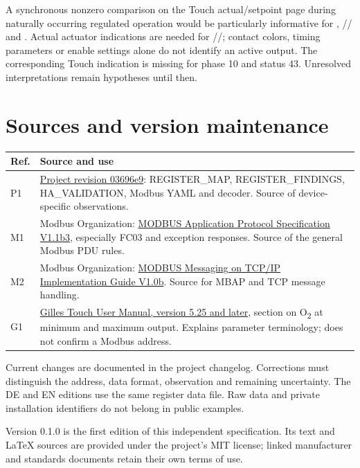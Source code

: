 \documentclass[10pt,a4paper]{article}
\begin{document}
A synchronous nonzero comparison on the Touch actual/setpoint page during naturally occurring regulated operation would be particularly informative for , // and . Actual actuator indications are needed for //; contact colors, timing parameters or enable settings alone do not identify an active output. The corresponding Touch indication is missing for phase 10 and status 43. Unresolved interpretations remain hypotheses until then.

\section{Sources and version maintenance}
\label{sec:sources}
\par\noindent\begin{tabularx}{\linewidth}{@{}L{13mm}X@{}}
\toprule\textbf{Ref.}&\textbf{Source and use}\\\midrule
P1 & \href{https://github.com/mschabhuettl/gilles-hpk-ra-modbus/tree/03696e929aa14fee1007d7c630489978c27533fc}{Project revision 03696e9}: REGISTER\_MAP, REGISTER\_FINDINGS, HA\_VALIDATION, Modbus YAML and decoder. Source of device-specific observations.\\
M1 & Modbus Organization: \href{https://www.modbus.org/file/secure/modbusprotocolspecification.pdf}{MODBUS Application Protocol Specification V1.1b3}, especially FC03 and exception responses. Source of the general Modbus PDU rules.\\
M2 & Modbus Organization: \href{https://www.modbus.org/file/secure/messagingimplementationguide.pdf}{MODBUS Messaging on TCP/IP Implementation Guide V1.0b}. Source for MBAP and TCP message handling.\\
G1 & \href{https://shop.baxi.se/documents/Gilles\%20Touch\%20-\%20manual\%20v5.25\%20(ENG).pdf}{Gilles Touch User Manual, version 5.25 and later}, section on O\textsubscript{2} at minimum and maximum output. Explains parameter terminology; does not confirm a Modbus address.\\\bottomrule
\end{tabularx}\par

Current changes are documented in the project changelog. Corrections must distinguish the address, data format, observation and remaining uncertainty. The DE and EN editions use the same register data file. Raw data and private installation identifiers do not belong in public examples.

Version 0.1.0 is the first edition of this independent specification. Its text and LaTeX sources are provided under the project's MIT license; linked manufacturer and standards documents retain their own terms of use.
\end{document}
